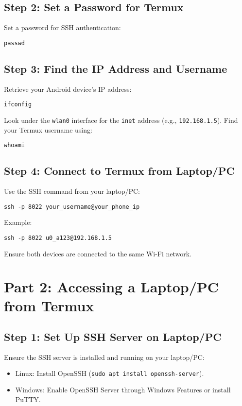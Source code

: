 \documentclass[conference]{IEEEtran}
\begin{document}
\subsection{Step 2: Set a Password for Termux}
Set a password for SSH authentication:
\begin{verbatim}
passwd
\end{verbatim}

\subsection{Step 3: Find the IP Address and Username}
Retrieve your Android device's IP address:
\begin{verbatim}
ifconfig
\end{verbatim}
Look under the \texttt{wlan0} interface for the \texttt{inet} address (e.g., \texttt{192.168.1.5}).  
Find your Termux username using:
\begin{verbatim}
whoami
\end{verbatim}

\subsection{Step 4: Connect to Termux from Laptop/PC}
Use the SSH command from your laptop/PC:
\begin{verbatim}
ssh -p 8022 your_username@your_phone_ip
\end{verbatim}
Example:  
\begin{verbatim}
ssh -p 8022 u0_a123@192.168.1.5
\end{verbatim}
Ensure both devices are connected to the same Wi-Fi network.

\section{Part 2: Accessing a Laptop/PC from Termux}
\subsection{Step 1: Set Up SSH Server on Laptop/PC}
Ensure the SSH server is installed and running on your laptop/PC:
\begin{itemize}[leftmargin=*]
    \item Linux: Install OpenSSH (\texttt{sudo apt install openssh-server}).
    \item Windows: Enable OpenSSH Server through Windows Features or install PuTTY.
\end{itemize}
\end{document}

